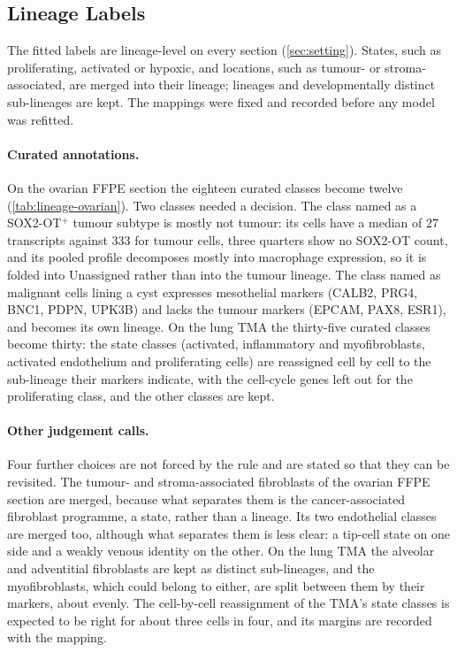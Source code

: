 \subsection{Lineage Labels}
\label{app:lineage}

 The fitted labels are lineage-level on every section (\cref{sec:setting}). States, such as proliferating, activated or hypoxic, and locations, such as tumour- or stroma-associated, are merged into their lineage; lineages and developmentally distinct sub-lineages are kept. The mappings were fixed and recorded before any model was refitted.

\paragraph{Curated annotations.}
On the ovarian FFPE section the eighteen curated classes become twelve (\cref{tab:lineage-ovarian}). Two classes needed a decision. The class named as a SOX2-OT$^+$ tumour subtype is mostly not tumour: its cells have a median of $27$ transcripts against $333$ for tumour cells, three quarters show no SOX2-OT count, and its pooled profile decomposes mostly into macrophage expression, so it is folded into Unassigned rather than into the tumour lineage. The class named as malignant cells lining a cyst expresses mesothelial markers (CALB2, PRG4, BNC1, PDPN, UPK3B) and lacks the tumour markers (EPCAM, PAX8, ESR1), and becomes its own lineage. On the lung TMA the thirty-five curated classes become thirty: the state classes (activated, inflammatory and myofibroblasts, activated endothelium and proliferating cells) are reassigned cell by cell to the sub-lineage their markers indicate, with the cell-cycle genes left out for the proliferating class, and the other classes are kept.

\paragraph{Other judgement calls.}
Four further choices are not forced by the rule and are stated so that they can be revisited. The tumour- and stroma-associated fibroblasts of the ovarian FFPE section are merged, because what separates them is the cancer-associated fibroblast programme, a state, rather than a lineage. Its two endothelial classes are merged too, although what separates them is less clear: a tip-cell state on one side and a weakly venous identity on the other. On the lung TMA the alveolar and adventitial fibroblasts are kept as distinct sub-lineages, and the myofibroblasts, which could belong to either, are split between them by their markers, about evenly. The cell-by-cell reassignment of the TMA's state classes is expected to be right for about three cells in four, and its margins are recorded with the mapping.

